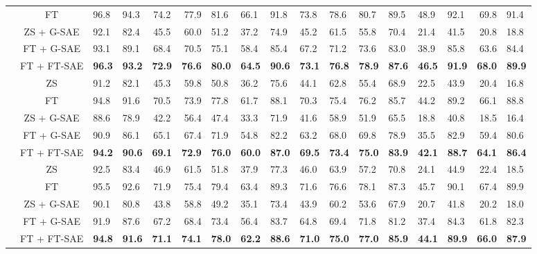 \begin{table}[!htbp]
{\begin{tabular}{lc A B C D E F G H I J K L M N O}
  & FT               & 96.8 & 94.3 & 74.2 & 77.9 & 81.6 & 66.1 & 91.8 & 73.8 & 78.6 & 80.7 & 89.5 & 48.9 & 92.1 & 69.8 & 91.4 \\
  \cmidrule(l){2-17}
  & ZS + G-SAE       & 92.1 & 82.4 & 45.5 & 60.0 & 51.2 & 37.2 & 74.9 & 45.2 & 61.5 & 55.8 & 70.4 & 21.4 & 41.5 & 20.8 & 18.8 \\
  & FT + G-SAE       & 93.1 & 89.1 & 68.4 & 70.5 & 75.1 & 58.4 & 85.4 & 67.2 & 71.2 & 73.6 & 83.0 & 38.9 & 85.8 & 63.6 & 84.4 \\
  & FT + FT-SAE      & \bf96.3 & \bf93.2 & \bf72.9 & \bf76.6 & \bf80.0 & \bf64.5 & \bf90.6 & \bf73.1 & \bf76.8 & \bf78.9 & \bf87.6 & \bf46.5 & \bf91.9 & \bf68.0 & \bf89.9 \\
\midrule
{}
  & ZS               & 91.2 & 82.1 & 45.3 & 59.8 & 50.8 & 36.2 & 75.6 & 44.1 & 62.8 & 55.4 & 68.9 & 22.5 & 43.9 & 20.4 & 16.8 \\
  & FT               & 94.8 & 91.6 & 70.5 & 73.9 & 77.8 & 61.7 & 88.1 & 70.3 & 75.4 & 76.2 & 85.7 & 44.2 & 89.2 & 66.1 & 88.8 \\
  \cmidrule(l){2-17}
  & ZS + G-SAE       & 88.6 & 78.9 & 42.2 & 56.4 & 47.4 & 33.3 & 71.9 & 41.6 & 58.9 & 51.9 & 65.5 & 18.8 & 40.8 & 18.5 & 16.4 \\
  & FT + G-SAE       & 90.9 & 86.1 & 65.1 & 67.4 & 71.9 & 54.8 & 82.2 & 63.2 & 68.0 & 69.8 & 78.9 & 35.5 & 82.9 & 59.4 & 80.6 \\
  & FT + FT-SAE      & \bf94.2 & \bf90.6 & \bf69.1 & \bf72.9 & \bf76.0 & \bf60.0 & \bf87.0 & \bf69.5 & \bf73.4 & \bf75.0 & \bf83.9 & \bf42.1 & \bf88.7 & \bf64.1 & \bf86.4 \\
\midrule
{}
  & ZS               & 92.5 & 83.4 & 46.9 & 61.5 & 51.8 & 37.9 & 77.3 & 46.0 & 63.9 & 57.2 & 70.8 & 24.1 & 44.9 & 22.4 & 18.5 \\
  & FT               & 95.5 & 92.6 & 71.9 & 75.4 & 79.4 & 63.4 & 89.3 & 71.6 & 76.6 & 78.1 & 87.3 & 45.7 & 90.1 & 67.4 & 89.9 \\
  \cmidrule(l){2-17}
  & ZS + G-SAE       & 90.1 & 80.8 & 43.8 & 58.8 & 49.2 & 35.1 & 73.4 & 43.9 & 60.2 & 53.6 & 67.9 & 20.7 & 41.8 & 20.2 & 18.0 \\
  & FT + G-SAE       & 91.9 & 87.6 & 67.2 & 68.4 & 73.4 & 56.4 & 83.7 & 64.8 & 69.4 & 71.8 & 81.2 & 37.4 & 84.3 & 61.8 & 82.3 \\
  & FT + FT-SAE      & \bf94.8 & \bf91.6 & \bf71.1 & \bf74.1 & \bf78.0 & \bf62.2 & \bf88.6 & \bf71.0 & \bf75.0 & \bf77.0 & \bf85.9 & \bf44.1 & \bf89.9 & \bf66.0 & \bf87.9 \\
\bottomrule
\end{tabular}%
}
\end{table}